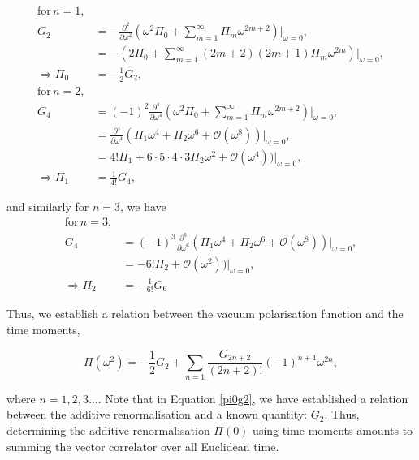 \documentclass{article}
\numberwithin{equation}{section} %
\begin{document}
\begin{align}
\mathrm{for}\, n=1,&\nonumber\\
G_2 &= -\frac{\partial^{2}}{\partial \omega^{2}} (\omega^2 \Pi_0 + \sum_{m=1}^\infty \Pi_m \omega^{2m+2})\bigg \vert_{\omega=0} ,\nonumber\\
&= -(2\Pi_0 + \sum_{m=1}^\infty (2m+2)(2m+1)\Pi_m \omega^{2m})\bigg \vert_{\omega=0} ,\nonumber\\
\Rightarrow \Pi_0 &= -\frac{1}{2}G_2,\nonumber\\
\mathrm{for}\, n=2,&\nonumber\\
G_4 &= (-1)^2\frac{\partial^{4}}{\partial \omega^{4}} (\omega^2 \Pi_0 + \sum_{m=1}^\infty \Pi_m \omega^{2m+2})\bigg \vert_{\omega=0} ,\nonumber\\
&=  \frac{\partial^{4}}{\partial \omega^{4}}(\Pi_1 \omega^{4} + \Pi_2 \omega^{6} + \mathcal{O}(\omega^8))\bigg \vert_{\omega=0} ,\nonumber\\
&= 4!\Pi_1 + 6\cdot 5\cdot 4\cdot 3\Pi_2 \omega^{2} + \mathcal{O}(\omega^4))\bigg \vert_{\omega=0} ,\nonumber\\
\Rightarrow \Pi_1 &= \frac{1}{4!}G_4,
\label{pi0g2}
\end{align}

\noindent and similarly for $n=3$, we have
\begin{equation}
\begin{split}
\mathrm{for}\, n=3,&\\
G_4 &= (-1)^3\frac{\partial^{6}}{\partial \omega^{6}} (\Pi_1 \omega^{4} + \Pi_2 \omega^{6} + \mathcal{O}(\omega^8))\bigg \vert_{\omega=0} ,\\
&=-6!\Pi_2 + \mathcal{O}(\omega^2))\bigg \vert_{\omega=0} ,\\
\Rightarrow \Pi_2 &= -\frac{1}{6!}G_6
\end{split}
\end{equation}

Thus, we establish a relation between the vacuum polarisation function and the time moments,

\begin{equation}
\Pi(\omega^2) = -\frac{1}{2}G_2 + \sum_{n=1} \frac{G_{2n+2}}{(2n+2)!}(-1)^{n+1} \omega^{2n},
\label{pi in terms of time moments}
\end{equation}

\noindent where $n=1,2,3...$. Note that in Equation \ref{pi0g2}, we have established a relation between the additive renormalisation and a known quantity: $G_2$. Thus, determining the additive renormalisation $\Pi(0)$ using time moments amounts to summing the vector correlator over all Euclidean time. 
\end{document}
